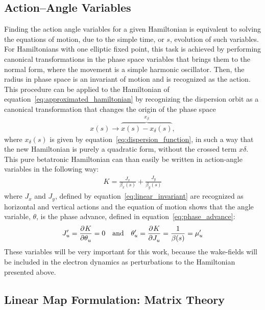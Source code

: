 \subsection{Action--Angle Variables}

    Finding the action angle variables for a given Hamiltonian is equivalent to solving the equations of motion, due to the simple time, or $s$, evolution of such variables. For  Hamiltonians with one elliptic fixed point, this task is achieved by performing canonical transformations in the phase space variables that brings them to the normal form, where the movement is a simple harmonic oscillator. Then, the radius in phase space is an invariant of motion and is recognized as the action. This procedure can be applied to the Hamiltonian of equation~\eqref{eq:approximated_hamiltonian} by recognizing the dispersion orbit as a canonical transformation that changes the origin of the phase space~\cite[Appendix A2]{Berg1996}
    \begin{align}\label{eq:off_momentum_canonical_transformation}
        x (s) \to \overbrace{x(s) - x_\delta (s)}^{x_\beta},
    \end{align}
    where $x_\delta (s)$ is given by equation~\eqref{eq:dispersion_function}, in such a way that the new Hamiltonian is purely a quadratic form, without the crossed term $x\delta$. This pure betatronic Hamiltonian can than easily be written in action-angle variables in the following way:
    \begin{align}\label{eq:betatron_hamiltonian}
        K = \frac{J_x}{\beta_x(s)} + \frac{J_y}{\beta_y(s)}
    \end{align}
    where $J_x$ and $J_y$, defined by equation~\eqref{eq:linear_invariant} are recognized as horizontal and vertical actions and the equation of motion shows that the angle variable, $\theta$, is the phase advance, defined in equation~\eqref{eq:phase_advance}:
    \begin{align}
        J'_u = \frac{\partial^{{}}K}{\partial \theta_u^{{}}} = 0 \quad \text{and} \quad \theta'_u = \frac{\partial^{{}}K}{\partial J_u^{{}}} = \frac{1}{\beta(s)} = \mu'_u
    \end{align}
    These variables will be very important for this work, because the wake-fields will be included in the electron dynamics as perturbations to the Hamiltonian presented above.

\subsection{Linear Map Formulation: Matrix Theory}

